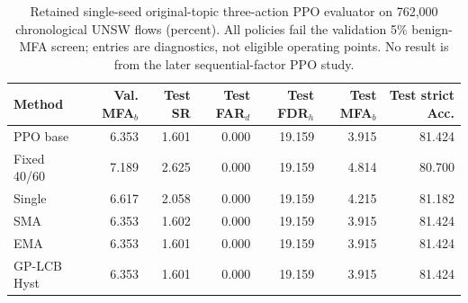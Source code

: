 \begin{table}[!htbp]
\centering
\caption{Retained single-seed original-topic three-action PPO evaluator on 762,000 chronological UNSW flows (percent). All policies fail the validation 5\% benign-MFA screen; entries are diagnostics, not eligible operating points. No result is from the later sequential-factor PPO study.}
\label{tab:supp_retained_ppo}
\scriptsize
\setlength{\tabcolsep}{3pt}
\begin{tabular}{lrrrrrr}
\toprule
Method & Val. MFA$_b$ & Test SR & Test FAR$_d$ & Test FDR$_h$ & Test MFA$_b$ & Test strict Acc.\\
\midrule
PPO base & 6.353 & 1.601 & 0.000 & 19.159 & 3.915 & 81.424 \\
Fixed 40/60 & 7.189 & 2.625 & 0.000 & 19.159 & 4.814 & 80.700 \\
Single & 6.617 & 2.058 & 0.000 & 19.159 & 4.215 & 81.182 \\
SMA & 6.353 & 1.602 & 0.000 & 19.159 & 3.915 & 81.424 \\
EMA & 6.353 & 1.601 & 0.000 & 19.159 & 3.915 & 81.424 \\
GP-LCB Hyst & 6.353 & 1.601 & 0.000 & 19.159 & 3.915 & 81.424 \\
\bottomrule
\end{tabular}
\end{table}
